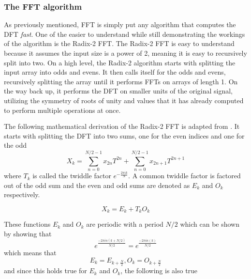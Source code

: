 




\subsubsection{The FFT algorithm}
As previously mentioned, FFT is simply put any algorithm that computes the DFT \textit{fast}. One of the easier to understand while still demonstrating the workings of the algorithm is the Radix-2 FFT. The Radix-2 FFT is easy to understand because it assumes the input size is a power of 2, meaning it is easy to recursively split into two. On a high level, the Radix-2 algorithm starts with splitting the input array into odds and evens. It then calls itself for the odds and evens, recursively splitting the array until it performs FFTs on arrays of length 1. On the way back up, it performs the DFT on smaller units of the original signal, utilizing the symmetry of roots of unity and values that it has already computed to perform multiple operations at once. 

The following mathematical derivation of the Radix-2 FFT is adapted from \cite{Rozman2019}. It starts with splitting the DFT into two sums, one for the even indices and one for the odd 
$$X_k = \sum^{N/2-1}_{n=0} x_{2n}T^{2n}+ \sum^{N/2-1}_{n=0} x_{2n+1}T^{2n+1}$$
where $T_k$ is called the twiddle factor $e^{-\frac{2\pi ik}{N}}$. A common twiddle factor is factored out of the odd sum and the even and odd sums are denoted as $E_k$ and $O_k$ respectively. 

$$X_k = E_k + T_kO_k$$

These functions $E_k$ and $O_k$ are periodic with a period $N/2$ which can be shown by showing that $$e^{\frac{-2\pi in(k+N/2)}{N/2}} = e^{\frac{-2\pi in(k)}{N/2}}$$
which means that 
$$E_k = E_{k+\frac{N}{2}}, O_k = O_{k+\frac{N}{2}}$$
and since this holds true for $E_k$ and $O_k$, the following is also true

